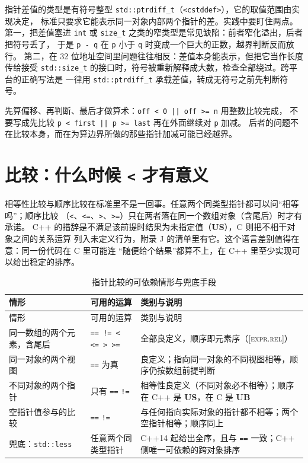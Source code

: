 \documentclass[12pt,a4paper,fontset=fandol]{ctexbook}
\newcommand{\cpp}[1]{C++#1}
\newcommand{\Tp}[1]{\texttt{#1}}
\newcommand{\Lang}[1]{\textsf{#1}}
\newcommand{\CL}{\Lang{C}}
\newcommand{\CPP}{\Lang{C++}}
\newcommand{\UB}{\textbf{\textsf{UB}}}
\newcommand{\USB}{\textbf{\textsf{US}}}
\newcommand{\Std}[1]{\textsc{[#1]}}
\newcommand{\Hdr}[1]{\texttt{<#1>}}
\begin{document}
指针差值的类型是有符号整型 \Tp{std::ptrdiff\_t}（\Hdr{cstddef}），它的取值范围由实现决定，
标准只要求它能表示同一对象内部两个指针的差。实践中要盯住两点。第一，把差值塞进
\Tp{int} 或 \Tp{size\_t} 之类的窄类型是常见缺陷：前者窄化溢出，后者把符号丢了，
于是 \Tp{p - q} 在 \Tp{p} 小于 \Tp{q} 时变成一个巨大的正数，越界判断反而放行。
第二，在 32 位地址空间里问题往往相反：差值本身能表示，但把它当作长度传给接受
\Tp{std::size\_t} 的接口时，符号被重新解释成大数，检查全部绕过。跨平台的正确写法是
一律用 \Tp{std::ptrdiff\_t} 承载差值，转成无符号之前先判断符号。

\begin{note}[title={区间检查的标准写法}]
先算偏移、再判断、最后才做算术：\Tp{off < 0 || off >= n} 用整数比较完成，
不要写成先比较 \Tp{p < first || p >= last} 再在外面继续对 \Tp{p} 加减。
后者的问题不在比较本身，而在为算边界所做的那些指针加减可能已经越界。
\end{note}

\section{比较：什么时候 \Tp{<} 才有意义}\label{sec:ub05-compare}

相等性比较与顺序比较在标准里不是一回事。任意两个同类型指针都可以问“相等吗”；顺序比较
（\Tp{<}、\Tp{<=}、\Tp{>}、\Tp{>=}）只在两者落在同一个数组对象（含尾后）时才有承诺。
\CPP{} 的措辞是不满足该前提时结果为未指定值（\USB{}），\CL{} 则把不相干对象之间的关系运算
列入未定义行为，附录 J 的清单里有它。这个语言差别值得在意：同一份代码在 \CL{} 里可能连
“随便给个结果”都算不上，在 \CPP{} 里至少实现可以给出稳定的排序。

\begin{longtable}{@{}>{\raggedright\arraybackslash}p{} >{\raggedright\arraybackslash}p{} >{\raggedright\arraybackslash}p{}@{}}
\caption{指针比较的可依赖情形与兜底手段}\label{tab:ub05-compare}\\
\toprule
情形 & 可用的运算 & 类别与说明 \\
\midrule
\endfirsthead
\toprule
情形 & 可用的运算 & 类别与说明 \\
\midrule
\endhead
\bottomrule
\endfoot
同一数组的两个元素，含尾后 & \Tp{== != < <= > >=} & 全部良定义，顺序即元素序（\Std{expr.rel}） \\
同一对象的两个视图 & \Tp{==} 为真 & 良定义；指向同一对象的不同视图相等，顺序仍按数组前提判断 \\
不同对象的两个指针 & 只有 \Tp{==} \Tp{!=} & 相等性良定义（不同对象必不相等）；顺序在 \CPP{} 是 \USB{}，在 \CL{} 是 \UB{} \\
空指针值参与的比较 & \Tp{==} \Tp{!=} & 与任何指向实际对象的指针都不相等；两个空指针相等；顺序同上 \\
兜底：\Tp{std::less} & 任意两个同类型指针 & \cpp{14} 起给出全序，且与 \Tp{==} 一致；\CPP{} 侧唯一可依赖的跨对象排序 \\
\end{longtable}
\end{document}
